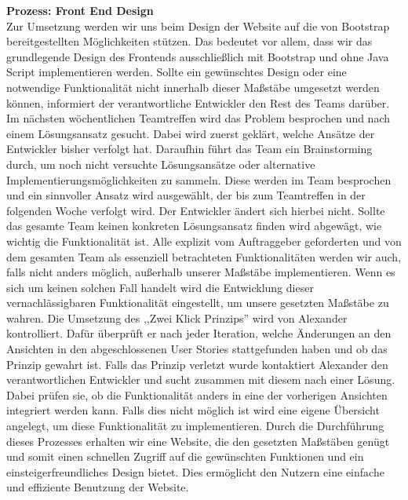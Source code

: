 \documentclass[accentcolor=tud0b,12pt,paper=a4]{tudreport}
\begin{document}
\noindent \textbf{Prozess: Front End Design}\\
Zur Umsetzung werden wir uns beim Design der Website auf die von Bootstrap bereitgestellten Möglichkeiten stützen. Das bedeutet vor allem, dass wir das grundlegende Design des Frontends ausschließlich mit Bootstrap und ohne Java Script implementieren werden. Sollte ein gewünschtes Design oder eine notwendige Funktionalität nicht innerhalb dieser Maßstäbe umgesetzt werden können, informiert der verantwortliche Entwickler den Rest des Teams darüber.
Im nächsten wöchentlichen Teamtreffen wird das Problem besprochen und nach einem Lösungsansatz gesucht. Dabei wird zuerst geklärt, welche Ansätze der Entwickler bisher verfolgt hat.  Daraufhin führt das Team ein Brainstorming durch, um noch nicht versuchte Lösungsansätze oder alternative Implementierungsmöglichkeiten zu sammeln. Diese werden im Team besprochen und ein sinnvoller Ansatz wird ausgewählt, der bis zum Teamtreffen in der folgenden Woche verfolgt wird. Der Entwickler ändert sich hierbei nicht.
Sollte das gesamte Team keinen konkreten Lösungsansatz finden wird abgewägt, wie wichtig die Funktionalität  ist. Alle explizit vom Auftraggeber geforderten und von dem gesamten Team als essenziell betrachteten Funktionalitäten werden wir auch, falls nicht anders möglich, außerhalb unserer Maßstäbe implementieren.
Wenn es sich um keinen solchen Fall handelt wird die Entwicklung dieser vernachlässigbaren Funktionalität eingestellt, um unsere gesetzten Maßstäbe zu wahren.
Die Umsetzung des ,,Zwei Klick Prinzips'' wird von Alexander kontrolliert. Dafür überprüft er nach jeder Iteration, welche Änderungen an den Ansichten in den abgeschlossenen User Stories stattgefunden haben und ob das Prinzip gewahrt ist. Falls das Prinzip verletzt wurde kontaktiert Alexander den verantwortlichen Entwickler und sucht zusammen mit diesem nach einer Lösung. Dabei prüfen sie, ob die Funktionalität anders in eine der vorherigen Ansichten integriert werden kann. Falls dies nicht möglich ist wird eine eigene Übersicht angelegt, um diese Funktionalität zu implementieren.
Durch die Durchführung dieses Prozesses erhalten wir eine Website, die den gesetzten Maßstäben genügt und somit einen schnellen Zugriff auf die gewünschten Funktionen und ein einsteigerfreundliches Design bietet. Dies ermöglicht den Nutzern eine einfache und effiziente Benutzung der Website. 



 



\newpage
	
\end{document}
